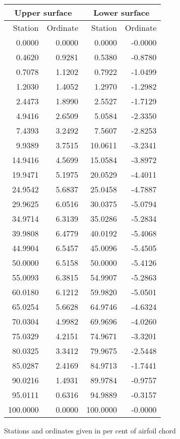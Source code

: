 \documentclass[11pt]{book}
\begin{document}
 \hspace{4mm}
 \begin{tabular}{|r|r|r|r|} \hline 
 \multicolumn{2}{|c|}{Upper surface} & \multicolumn{2}{|c|}{Lower surface} \\
 \hline
 Station & Ordinate & Station & Ordinate \\
 \hline
0.0000 & 0.0000 & 0.0000 & -0.0000 \\
0.4620 & 0.9281 & 0.5380 & -0.8780 \\
0.7078 & 1.1202 & 0.7922 & -1.0499 \\
1.2030 & 1.4052 & 1.2970 & -1.2982 \\
2.4473 & 1.8990 & 2.5527 & -1.7129 \\
4.9416 & 2.6509 & 5.0584 & -2.3350 \\
7.4393 & 3.2492 & 7.5607 & -2.8253 \\
9.9389 & 3.7515 & 10.0611 & -3.2341 \\
14.9416 & 4.5699 & 15.0584 & -3.8972 \\
19.9471 & 5.1975 & 20.0529 & -4.4011 \\
24.9542 & 5.6837 & 25.0458 & -4.7887 \\
29.9625 & 6.0516 & 30.0375 & -5.0794 \\
34.9714 & 6.3139 & 35.0286 & -5.2834 \\
39.9808 & 6.4779 & 40.0192 & -5.4068 \\
44.9904 & 6.5457 & 45.0096 & -5.4505 \\
50.0000 & 6.5158 & 50.0000 & -5.4126 \\
55.0093 & 6.3815 & 54.9907 & -5.2863 \\
60.0180 & 6.1212 & 59.9820 & -5.0501 \\
65.0254 & 5.6628 & 64.9746 & -4.6324 \\
70.0304 & 4.9982 & 69.9696 & -4.0260 \\
75.0329 & 4.2151 & 74.9671 & -3.3201 \\
80.0325 & 3.3412 & 79.9675 & -2.5448 \\
85.0287 & 2.4169 & 84.9713 & -1.7441 \\
90.0216 & 1.4931 & 89.9784 & -0.9757 \\
95.0111 & 0.6316 & 94.9889 & -0.3157 \\
100.0000 & 0.0000 & 100.0000 & -0.0000 \\
 \hline 
 \end{tabular}
 \vspace{8mm}

Stations and ordinates given in per cent of airfoil chord
\end{document}

